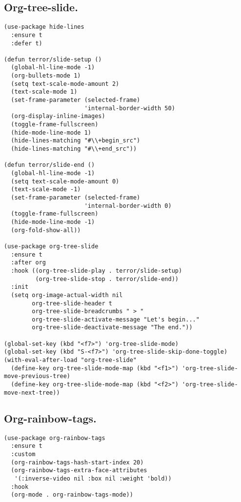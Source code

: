 \documentclass[11pt]{article}
\begin{document}
\subsection{Org-tree-slide.}
\label{sec:org10e0e57}
\begin{verbatim}
(use-package hide-lines
  :ensure t
  :defer t)

(defun terror/slide-setup ()
  (global-hl-line-mode -1)
  (org-bullets-mode 1)
  (setq text-scale-mode-amount 2)
  (text-scale-mode 1)
  (set-frame-parameter (selected-frame)
                       'internal-border-width 50)
  (org-display-inline-images)
  (toggle-frame-fullscreen)
  (hide-mode-line-mode 1)
  (hide-lines-matching "#\\+begin_src")
  (hide-lines-matching "#\\+end_src"))

(defun terror/slide-end ()
  (global-hl-line-mode -1)
  (setq text-scale-mode-amount 0)
  (text-scale-mode -1)
  (set-frame-parameter (selected-frame)
                       'internal-border-width 0)
  (toggle-frame-fullscreen)
  (hide-mode-line-mode -1)
  (org-fold-show-all))

(use-package org-tree-slide
  :ensure t
  :after org
  :hook ((org-tree-slide-play . terror/slide-setup)
         (org-tree-slide-stop . terror/slide-end))
  :init
  (setq org-image-actual-width nil
        org-tree-slide-header t
        org-tree-slide-breadcrumbs " > "
        org-tree-slide-activate-message "Let's begin..."
        org-tree-slide-deactivate-message "The end."))

(global-set-key (kbd "<f7>") 'org-tree-slide-mode)
(global-set-key (kbd "S-<f7>") 'org-tree-slide-skip-done-toggle)
(with-eval-after-load "org-tree-slide"
  (define-key org-tree-slide-mode-map (kbd "<f1>") 'org-tree-slide-move-previous-tree)
  (define-key org-tree-slide-mode-map (kbd "<f2>") 'org-tree-slide-move-next-tree))
\end{verbatim}
\subsection{Org-rainbow-tags.}
\label{sec:org1582ca8}
\begin{verbatim}
(use-package org-rainbow-tags
  :ensure t
  :custom
  (org-rainbow-tags-hash-start-index 20)
  (org-rainbow-tags-extra-face-attributes
   '(:inverse-video nil :box nil :weight 'bold))
  :hook
  (org-mode . org-rainbow-tags-mode))
\end{verbatim}
\end{document}
